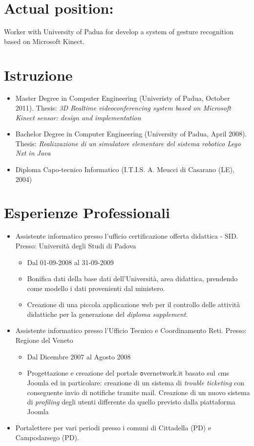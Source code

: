 \documentclass[pdftex,a4paper,12pt,twoside,titlepage,italian,openright]{article}
\begin{document}
\section*{Actual position:}
 	Worker with University of Padua for develop a system of gesture recognition based on Microsoft Kinect.
\section*{Istruzione}
\begin{itemize}
	\item Master Degree in Computer Engineering (Univeristy of Padua, October 2011).
	Thesis: {\itshape 3D Realtime videoconferencing system based on Microsoft Kinect sensor: design and implementation }
	\item Bachelor Degree in Computer Engineering 
	(University of Padua, April 2008). Thesis:
	{\itshape Realizzazione di un simulatore elementare del sistema robotico Lego Nxt
	in Java}
	\item Diploma Capo-tecnico Informatico (I.T.I.S. A. Meucci di Casarano (LE), 2004)
\end{itemize}
\section*{Esperienze Professionali}
\begin{itemize}
	\item Assistente informatico presso l'ufficio certificazione offerta didattica - SID.
	Presso: Università degli Studi di Padova
	\begin{itemize}
		\item Dal 01-09-2008 al 31-09-2009 
		\item Bonifica dati della base dati dell'Università, area didattica, prendendo come 
		modello i dati provenienti dal ministero.
		\item Creazione di una piccola applicazione web per il controllo delle attività didattiche
		per la generazione del \textit{diploma supplement}.
	\end{itemize}
	\item Assistente informatico presso l'Ufficio Tecnico e Coordinamento Reti. Presso:
	Regione del Veneto
	\begin{itemize}
		\item Dal Dicembre 2007 al Agosto 2008
		\item Progettazione e creazione del portale {\texttt overnetwork.it} basato sul {\textit cms Joomla}
		ed in particolare: creazione di un sistema di \textit{trouble ticketing} con conseguente 
		invio di notifiche tramite mail. Creazione di un nuovo sistema di \textit{profiling}
		degli utenti differente da quello previsto dalla piattaforma Joomla
	\end{itemize}
	\item Portalettere per vari periodi presso i comuni di Cittadella (PD) e Campodarsego (PD).
\end{itemize}
\end{document}
